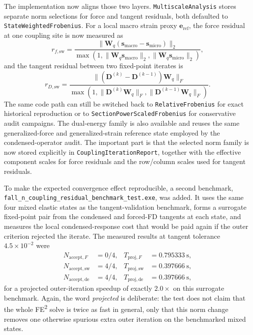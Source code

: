 The implementation now aligns those two layers.  \texttt{MultiscaleAnalysis}
stores separate norm selections for force and tangent residuals, both defaulted
to \texttt{StateWeightedFrobenius}.  For a local macro strain proxy
\(\mathbf{e}_{\mathrm{ref}}\), the force residual at one coupling site is now
measured as
\begin{equation}
  r_{f,\mathrm{sw}}
  =
  \frac{\lVert \mathbf{W}_q
    (\mathbf{s}_{\mathrm{macro}}-\mathbf{s}_{\mathrm{micro}})\rVert_2}
  {\max\!\left(
    1,
    \lVert \mathbf{W}_q \mathbf{s}_{\mathrm{macro}}\rVert_2,
    \lVert \mathbf{W}_q \mathbf{s}_{\mathrm{micro}}\rVert_2
  \right)},
\end{equation}
and the tangent residual between two fixed-point iterates is
\begin{equation}
  r_{D,\mathrm{sw}}
  =
  \frac{\lVert (\mathbf{D}^{(k)}-\mathbf{D}^{(k-1)})\mathbf{W}_q\rVert_F}
  {\max\!\left(
    1,
    \lVert \mathbf{D}^{(k)}\mathbf{W}_q\rVert_F,
    \lVert \mathbf{D}^{(k-1)}\mathbf{W}_q\rVert_F
  \right)}.
\end{equation}
The same code path can still be switched back to
\texttt{RelativeFrobenius} for exact historical reproduction or to
\texttt{SectionPowerScaledFrobenius} for conservative audit campaigns.  The
dual-energy family is also available and reuses the same generalized-force and
generalized-strain reference state employed by the condensed-operator audit.
The important part is that the selected norm family is now stored explicitly in
\texttt{CouplingIterationReport}, together with the effective component scales
for force residuals and the row/column scales used for tangent residuals.

To make the expected convergence effect reproducible, a second benchmark,
\texttt{fall\_n\_coupling\_residual\_benchmark\_test.exe}, was added.  It uses
the same four mixed elastic states as the tangent-validation benchmark, forms a
surrogate fixed-point pair from the condensed and forced-FD tangents at each
state, and measures the local condensed-response cost that would be paid again
if the outer criterion rejected the iterate.  The measured results at
tangent tolerance \(4.5\times 10^{-2}\) were
\begin{align}
  N_{\mathrm{accept},F} &= 0/4, &
  T_{\mathrm{proj},F} &= 0.795333~\mathrm{s}, \\
  N_{\mathrm{accept},\mathrm{sw}} &= 4/4, &
  T_{\mathrm{proj},\mathrm{sw}} &= 0.397666~\mathrm{s}, \\
  N_{\mathrm{accept},\mathrm{de}} &= 4/4, &
  T_{\mathrm{proj},\mathrm{de}} &= 0.397666~\mathrm{s},
\end{align}
for a projected outer-iteration speedup of exactly \(2.0\times\) on this
surrogate benchmark.  Again, the word \emph{projected} is deliberate: the test
does not claim that the whole FE\textsuperscript{2} solve is twice as fast in
general, only that this norm change removes one otherwise spurious extra outer
iteration on the benchmarked mixed states.

